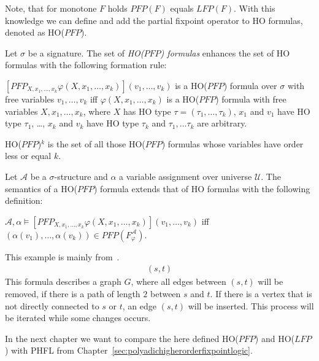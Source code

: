 Note, that for monotone $F$ holds $\mathit{PFP}(F)$ equals $\mathit{LFP}(F)$. With this knowledge we can define and
add the partial fixpoint operator to HO formulas, denoted as HO($\mathit{PFP}$).

\begin{definition}
    Let $\sigma$ be a signature. The set of \emph{HO($\mathit{PFP}$) formulas} enhances the set of HO formulas with the
    following formation rule:
    \begin{compactitem}
        \item $[\mathit{PFP}_{X, x_1, \dots, x_k}\varphi(X, x_1, \dots, x_k)](v_1, \dots, v_k)$ is a HO($\mathit{PFP}$) formula over
        $\sigma$ with free variables $v_1, \dots, v_k$ iff $\varphi(X, x_1, \dots, x_k)$ is a HO($\mathit{PFP}$) formula with
        free variables $X, x_1, \dots, x_k$, where $X$ has HO type $\tau = (\tau_1, \dots, \tau_k)$, $x_1$ and $v_1$
        have HO type $\tau_1$, \dots, $x_k$ and $v_k$ have HO type $\tau_k$ and $\tau_1, \dots \tau_k$ are arbitrary.
    \end{compactitem}
\end{definition}

HO($\mathit{PFP}$)$^k$ is the set of all those HO($\mathit{PFP}$) formulas whose variables have order less or equal $k$.

\begin{definition}
    Let $\mathcal{A}$ be a $\sigma$-structure and $\alpha$ a variable assignment over universe $\mathcal{U}$. The
    semantics of a HO($\mathit{PFP}$) formula extends that of HO formulas with the following definition:
    \begin{compactitem}
        \item $\mathcal{A}, \alpha \models [\mathit{PFP}_{X, x_1, \dots, x_k}\varphi(X, x_1, \dots, x_k)](v_1, \dots, v_k)$
        iff $(\alpha(v_1), \dots, \alpha(v_k)) \in \mathit{PFP}(F_\varphi^\mathcal{A})$.
    \end{compactitem}
\end{definition}

\begin{example}
    This example is mainly from~\cite{abiteboul1995computing}.
    \begin{align*}
    [PFP_{G, x, y}(&G(x, y) \wedge \neg \exists z\colon\odot.\,(G(x, z) \wedge G(z, y)) \vee \\
    &\exists z\colon\odot.\,(\neg G(x, z)\wedge\neg G(z, x) \wedge \neg G(y, z) \wedge G(z, y)))](s, t)
    \end{align*}
    This formula describes a graph $G$, where all edges between $(s, t)$ will be removed, if there is a path of
    length $2$ between $s$ and $t$. If there is a vertex that is not directly connected to $s$ or $t$, an edge $(s,
    t)$ will be inserted. This process will be iterated while some changes occurs.

\end{example}

In the next chapter we want to compare the here defined HO($\mathit{PFP}$) and HO($\mathit{LFP}$) with PHFL from
Chapter~\ref{sec:polyadichigherorderfixpointlogic}.